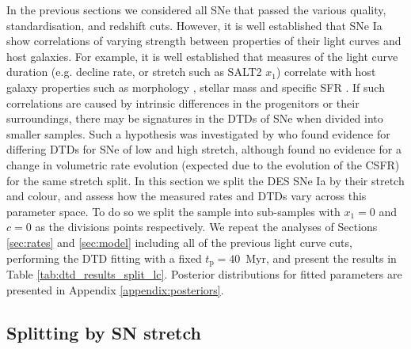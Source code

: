 \documentclass[fleqn,usenatbib]{mnras}
\begin{document}
In the previous sections we considered all SNe that passed the various quality, standardisation, and redshift cuts. However, it is well established that SNe Ia show correlations of varying strength between properties of their light curves and host galaxies. For example, it is well established that measures of the light curve duration (e.g. decline rate, or stretch such as SALT2 $x_1$) correlate with host galaxy properties such as morphology \citep{Hamuy1995,Hamuy2000,Mannucci2005}, stellar mass \citep{Kelly2010,Lampeitl2010,Sullivan2010} and specific SFR \citep{Rigault2013,Rigault2018}. If such correlations are caused by intrinsic differences in the progenitors or their surroundings, there may be signatures in the DTDs of SNe when divided into smaller samples. Such a hypothesis was investigated by \citet{Brandt2010} who found evidence for differing DTDs for SNe of low and high stretch, although \citet{Perrett2012} found no evidence for a change in volumetric rate evolution (expected due to the evolution of the CSFR) for the same stretch split. In this section we split the DES SNe Ia by their stretch and colour, and assess how the measured rates and DTDs vary across this parameter space. To do so we split the sample into sub-samples with $x_1 = 0$ and $c=0$ as the divisions points respectively. We repeat the analyses of Sections \ref{sec:rates} and \ref{sec:model} including all of the previous light curve cuts, performing the DTD fitting with a fixed $t_{\mathrm{p}} = 40$~Myr, and present the results in Table \ref{tab:dtd_results_split_lc}. Posterior distributions for fitted parameters are presented in Appendix \ref{appendix:posteriors}.

\subsection{Splitting by SN stretch \label{subsec:split_x1}}
\end{document}
